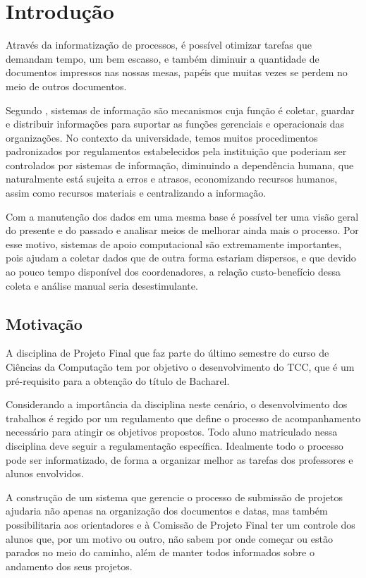 \chapter{Introdução}
Através da informatização de processos, é possível otimizar tarefas que demandam tempo, 
um bem escasso, e também diminuir a quantidade de documentos impressos nas nossas mesas, 
papéis que muitas vezes se perdem no meio de outros documentos.

Segundo \cite{Freitas:1997}, sistemas de informação são mecanismos cuja função é coletar, guardar e 
distribuir informações para suportar as funções gerenciais e operacionais das organizações.
No contexto da universidade, temos muitos procedimentos padronizados por regulamentos estabelecidos
pela instituição que poderiam ser controlados por sistemas de informação, diminuindo a
dependência humana, que naturalmente está sujeita a erros e atrasos, economizando recursos humanos, 
assim como recursos materiais e centralizando a informação. 

Com a manutenção dos dados em uma mesma base é possível ter uma visão geral do presente 
e do passado e analisar meios de melhorar ainda mais o processo. Por esse motivo, sistemas de apoio
computacional são extremamente importantes, pois ajudam a coletar dados que de outra forma estariam
dispersos, e que devido ao pouco tempo disponível dos coordenadores, a relação custo-benefício dessa
coleta e análise manual seria desestimulante.

\section{Motivação}
A disciplina de Projeto Final que faz parte do último semestre do curso de Ciências da Computação
tem por objetivo o desenvolvimento do TCC, que é um pré-requisito para a obtenção do título de Bacharel.

Considerando a importância da disciplina neste cenário, o desenvolvimento dos trabalhos é regido por um
regulamento que define o processo de acompanhamento necessário para atingir os objetivos propostos.
Todo aluno matriculado nessa disciplina deve seguir a regulamentação específica. Idealmente todo o 
processo pode ser informatizado, de forma a organizar melhor as tarefas dos professores e alunos envolvidos.

A construção de um sistema que gerencie o processo de submissão de projetos ajudaria 
não apenas na organização dos documentos e datas, mas também possibilitaria aos 
orientadores e à Comissão de Projeto Final ter um controle dos alunos que, por um 
motivo ou outro, não sabem por onde começar ou estão parados no meio do caminho, 
além de manter todos informados sobre o andamento dos seus projetos.


